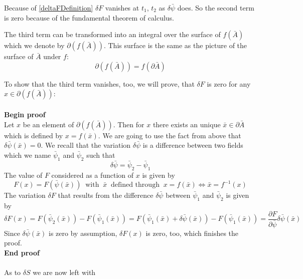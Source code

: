 \documentclass{article}
\begin{document}
Because of \ref{deltaFDefinition}
$\delta F$ vanishes at $t_1$, $t_2$ as $\delta \bar{\psi}$ does. So the second term is zero because of the fundamental theorem of calculus.

The third term can be transformed into an integral over the surface of $f(\bar{A})$ which we denote by $\partial (f(\bar{A}))$. This surface is the same as the picture of the surface of $\bar{A}$ under $f$: 
\begin{equation}
\partial (f(\bar{A})) = f(\partial \bar{A})
\end{equation}

To show that the third term vanishes, too, we will prove, that $\delta F$ is zero for any $x \in \partial (f(\bar{A}))$:
\\ 
\\

\noindent \textbf{Begin proof}
\\
Let $x$ be an element of $\partial (f(\bar{A}))$. Then for $x$ there exists an unique $\bar{x} \in \partial \bar{A}$ which is defined by $x=f(\bar{x})$. We are going to use the fact from above that $\delta \bar{\psi}(\bar{x}) = 0$. 
We recall that the variation $\delta \bar{\psi}$ is a difference between two fields which we name $\bar{\psi}_1$ and $\bar{\psi}_2$ such that
\begin{equation}
\delta \bar{\psi} = \bar{\psi}_2 - \bar{\psi}_1
\end{equation}
The value of $F$ considered as a function of $x$ is given by 
\begin{equation}
F(x) = F(\bar{\psi}(\bar{x})) \;\; \text{with} \;\; \bar{x} \;\; \text{defined through} \;\; x=f(\bar{x}) 
\iff \bar{x} = f^{-1}(x)
\end{equation}
The variation $\delta F$ that results from the difference $\delta \bar{\psi}$ between $\bar{\psi}_1$ and $\bar{\psi}_2$ is given by
\begin{equation}
\delta F(x) = F(\bar{\psi}_2(\bar{x})) - F(\bar{\psi}_1(\bar{x})) 
= F(\bar{\psi}_1(\bar{x}) + \delta \bar{\psi} (\bar{x})) - F(\bar{\psi}_1(\bar{x})) 
= \frac{\partial F}{\partial \bar{\psi}} \delta \bar{\psi} (\bar{x})
\end{equation}
Since $\delta \bar{\psi}(\bar{x})$ is zero by assumption, $\delta F(x)$ is zero, too, which finishes the proof.
\\
\textbf{End proof}
\\
\\

\noindent As to $\delta S$ we are now left with
\end{document}
